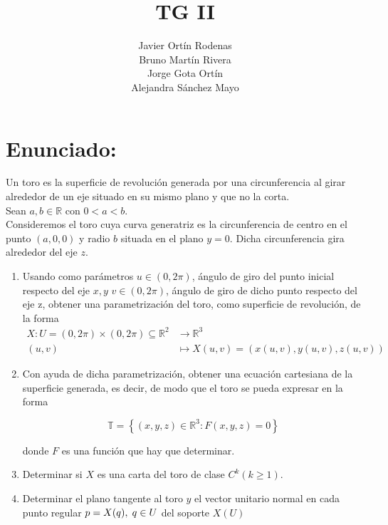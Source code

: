 \documentclass{article}
\title{TG II}
\author{
    Javier Ortín Rodenas \\
    Bruno Martín Rivera \\
    Jorge Gota Ortín \\
    Alejandra Sánchez Mayo
}
\date{}
\begin{document}
\maketitle
\noindent
\section{Enunciado:}
Un toro es la superficie de revolución generada por una circunferencia al girar alrededor de un eje situado en su mismo plano y que no la corta.\\
Sean $a, b \in \mathbb{R}$ con $0<a<b$.\\
Consideremos el toro cuya curva generatriz es la circunferencia de centro
en el punto $(a, 0,0)$ y radio $b$ situada en el plano $y=0$.
Dicha circunferencia gira alrededor del eje $z$.\\[2ex]

\begin{enumerate}[label=(\roman*)]
    \item Usando como parámetros $u \in(0,2 \pi)$, ángulo de giro del punto inicial respecto del eje $x, y$ $v \in(0,2 \pi)$, ángulo de giro de dicho punto respecto del eje z, obtener una parametrización del toro, como superficie de revolución, de la forma
    $$
    \begin{aligned}
        X: U=(0,2 \pi) \times(0,2 \pi) \subseteq \mathbb{R}^{2} & \longrightarrow \mathbb{R}^{3} \\
        (u, v) & \longmapsto X(u, v)=(x(u, v), y(u, v), z(u, v))
    \end{aligned}
    $$
    
    \item Con ayuda de dicha parametrización, obtener una ecuación cartesiana de la superficie generada, es decir, de modo que el toro se pueda expresar en la forma
    
    $$
    \mathbb{T}=\left\{(x, y, z) \in \mathbb{R}^{3}: F(x, y, z)=0\right\}
    $$
    
    \noindent donde $F$ es una función que hay que determinar.\\

\item Determinar si $X$ es una carta del toro de clase $C^{k}(k \geq 1)$.\\
\item Determinar el plano tangente al toro $y$ el vector unitario normal en cada punto regular $p=X(q), \hspace{1mm} q \in U$ del soporte $X(U)$

\end{enumerate}
\end{document}
